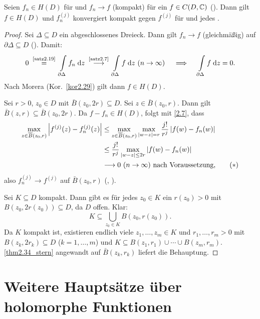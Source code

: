 \documentclass[a4paper,twoside,DIV15,BCOR12mm]{scrbook}
\begin{document}
\begin{thm} \label{thm2.34}
  Seien $f_n\in H(D)$ für  und $f_n\to f$ (kompakt) für ein $f\in C(D,\mathbb{C})$ (\ninf). Dann gilt $f\in H(D)$ und $f_n^{(j)}$
  konvergiert kompakt gegen $f^{(j)}$ für \ninf und jedes .
\end{thm}
\begin{proof}
  Sei $\Delta\subseteq D$ ein abgeschlossenes Dreieck. Dann gilt $f_n\to f$ (gleichmäßig) auf $\partial\Delta\subseteq D$
  (\ninf). Damit:
  \[ 0 \nach{=}{\ref{satz2.19}} \Integral{\partial\Delta}{}{f_n}{z} \nach{\longrightarrow}{\ref{satz2.7}}
  \Integral{\partial\Delta}{}{f}{z} \ (\ninf)
  \quad \folgt \quad \Integral{\partial\Delta}{}{f}{z} = 0. \]
  Nach Morera (Kor.~\ref{kor2.29}) gilt dann $f\in H(D)$.

  Sei $r>0$, $z_0\in D$ mit $\bar{B}(z_0,2r)\subseteq D$. Sei $z\in\bar{B}(z_0,r)$. Dann gilt
  $\bar{B}(z,r)\subseteq\bar{B}(z_0,2r)$. Da $f-f_n\in H(D)$, folgt mit \eqref{2.7}, dass
  \begin{align*} \label{thm2.34_stern}
    \max_{z\in\overline{B}(z_0,r)}{\left\lvert f^{(j)}(z)-f_n^{(j)}(z)\right\lvert} & \le
    \max_{z\in\overline{B}(z_0,r)}{\max_{\left\lvert w-z\right\lvert=r}{\frac{j!}{r^j}\left\lvert f(w)-f_n(w)\right\lvert}} \\ & \le
    \frac{j!}{r^j} \max_{\left\lvert w-z\right\lvert\le2r}{\left\lvert f(w)-f_n(w)\right\lvert} \\ & \longrightarrow 0\ (n\rightarrow\infty) \text{ nach Voraussetzung,} \tag{$*$}
  \end{align*}
  also $f_n^{(j)} \to f^{(j)}$ auf $\bar{B}(z_0,r)$ (\ninf, ).

  Sei $K\subseteq D$ kompakt. Dann gibt es für jedes $z_0\in K$ ein $r(z_0)>0$ mit $B(z_0,2r(z_0))\subseteq D$, da $D$ offen. Klar:
  \[ K \subseteq \bigcup_{z_0\in K}{B(z_0,r(z_0))}. \] Da $K$ kompakt ist, existieren endlich viele $z_1,\dotsc,z_m\in K$ und
  $r_1,\dotsc,r_m>0$ mit $B(z_k,2r_k)\subseteq D$ ($k=1,\dotsc,m$) und $K\subseteq B(z_1,r_1)\cup\dotsb\cup
  B(z_m,r_m)$. \eqref{thm2.34_stern} angewandt auf $\bar{B}(z_k,r_k)$ liefert die Behauptung.
\end{proof}



\section{Weitere Hauptsätze über holomorphe Funktionen}
\end{document}
